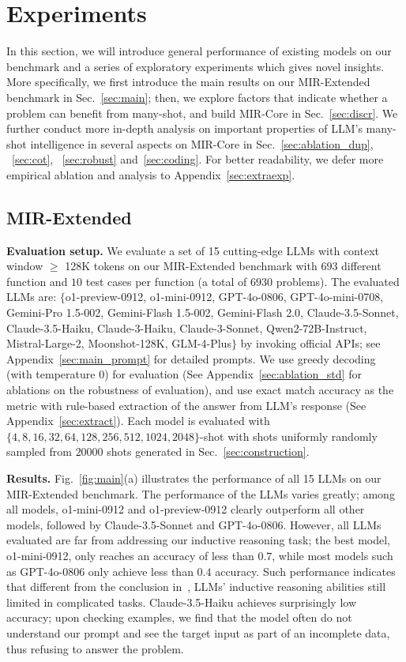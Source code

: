 \section{Experiments}
\label{sec:exp}
In this section, we will introduce general performance of existing models on our benchmark and a series of exploratory experiments which gives novel insights. More specifically, we first introduce the main results on our MIR-Extended benchmark in Sec.~\ref{sec:main}; then, we explore factors that indicate whether a problem can benefit from many-shot, and build MIR-Core in Sec.~\ref{sec:discr}. We further conduct more in-depth analysis on important properties of LLM's many-shot intelligence in several aspects on MIR-Core in Sec.~\ref{sec:ablation_dup}, ~\ref{sec:cot}, ~\ref{sec:robust} and~\ref{sec:coding}. For better readability, we defer more empirical ablation and analysis to Appendix~\ref{sec:extraexp}.

\subsection{MIR-Extended}
\label{sec:mir-ext}
\textbf{Evaluation setup.} We evaluate a set of 15 cutting-edge LLMs with context window $\geq$ 128K tokens on our MIR-Extended benchmark with $693$ different function and $10$ test cases per function (a total of $6930$ problems). The evaluated LLMs are: $\{$o1-preview-0912, o1-mini-0912, GPT-4o-0806, GPT-4o-mini-0708, Gemini-Pro 1.5-002, Gemini-Flash 1.5-002, Gemini-Flash 2.0, Claude-3.5-Sonnet, Claude-3.5-Haiku, Claude-3-Haiku, Claude-3-Sonnet, Qwen2-72B-Instruct, Mistral-Large-2, Moonshot-128K, GLM-4-Plus$\}$ by invoking official APIs; see Appendix~\ref{sec:main_prompt} for detailed prompts. We use greedy decoding (with temperature $0$) for evaluation (See Appendix~\ref{sec:ablation_std} for ablations on the robustness of evaluation), and use exact match accuracy as the metric with rule-based extraction of the answer from LLM's response (See Appendix~\ref{sec:extract}). Each model is evaluated with $\{4, 8, 16, 32, 64, 128, 256, 512, 1024, 2048\}$-shot with shots uniformly randomly sampled from $20000$ shots generated in Sec.~\ref{sec:construction}.


\textbf{Results.} Fig.~\ref{fig:main}(a) illustrates the performance of all 15 LLMs on our MIR-Extended benchmark. The performance of the LLMs varies greatly; among all models, o1-mini-0912 and o1-preview-0912 clearly outperform all other models, followed by Claude-3.5-Sonnet and GPT-4o-0806. However, all LLMs evaluated are far from addressing our inductive reasoning task; the best model, o1-mini-0912, only reaches an accuracy of less than $0.7$, while most models such as GPT-4o-0806 only achieve less than $0.4$ accuracy. Such performance indicates that different from the conclusion in~\citet{cheng2024inductive}, LLMs' inductive reasoning abilities still limited in complicated tasks. Claude-3.5-Haiku achieves surprisingly low accuracy; upon checking examples, we find that the model often do not understand our prompt and see the target input as part of an incomplete data, thus refusing to answer the problem.

